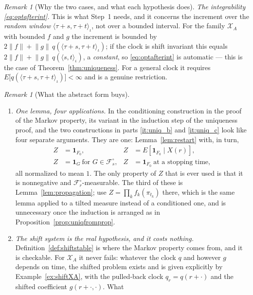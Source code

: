 \documentclass[11pt,a4paper]{article}
\theoremstyle{plain}
\theoremstyle{definition}
\theoremstyle{remark}
\newtheorem{remark}[theorem]{Remark}
\newcommand{\Filt}{\mathcal{F}}
\newcommand{\XX}{\mathcal{X}}                  %
\newcommand{\one}{\mathbf{1}}
\newcommand{\EK}{\cite{EK86}}
\begin{document}
\begin{remark}[Why the two cases, and what each hypothesis does]
  \emph{The integrability \eqref{eq:optafterint}.}  This is what Step~1 needs, and
  it concerns the increment over the \emph{random window}
  $\langle \tau+s, \tau+t \rangle_\iota$, not over a bounded interval.  For the
  family $\XX_A$ with bounded $f$ and $g$ the increment is bounded by
  $2\lVert f\rVert + \lVert g\rVert\, q(\langle \tau+s,\tau+t\rangle_\iota)$; if
  the clock is shift invariant this equals
  $2\lVert f\rVert + \lVert g\rVert\, q(\langle s,t\rangle_\iota)$, a
  \emph{constant}, so \eqref{eq:optafterint} is automatic --- this is the case of
  Theorem~\ref{thm:uniqueness}.  For a general clock it requires
  $E\bigl[q(\langle \tau+s,\tau+t\rangle_\iota)\bigr] < \infty$ and is a genuine
  restriction.
\end{remark}

\begin{remark}[What the abstract form buys]
  \label{rem:absuniqgain}
  \begin{enumerate}[label=(\roman*)]
  \item \emph{One lemma, four applications.}  In \EK{} the conditioning
    construction in the proof of the Markov property, its variant in the
    induction step of the uniqueness proof, and the two constructions in parts
    \ref{it:uniq_b} and \ref{it:uniq_c} look like four separate arguments.  They
    are one: Lemma~\ref{lem:restart} with, in turn,
    \begin{align*}
      Z &= \one_{F_0} , &
      Z &= E[\one_{F_0}\mid X(r)] , \\
      Z &= \one_G \ \text{for } G \in \Filt^\circ_s , &
      Z &= \one_{F_0} \ \text{at a stopping time} ,
    \end{align*}
    all normalized to mean $1$.  The only property of $Z$ that is ever used is
    that it is nonnegative and $\Filt^\circ_r$-measurable.  The third of these is
    Lemma~\ref{lem:propagation}; \EK{} use $Z = \prod_k f_k(\pi_{t_k})$ there,
    which is the same lemma applied to a tilted measure instead of a conditioned
    one, and is unnecessary once the induction is arranged as in
    Proposition~\ref{prop:uniqfromprop}.
  \item \emph{The shift system is the real hypothesis, and it costs nothing.}
    Definition~\ref{def:shiftstable} is where the Markov property comes from, and
    it is checkable.  For $\XX_A$ it never fails: whatever the clock $q$ and
    however $g$ depends on time, the shifted problem exists and is given
    explicitly by Example~\ref{ex:shiftXA}, with the pulled-back clock
    $q_r = q(r + \cdot)$ and the shifted coefficient $g(r+\cdot,\cdot)$.  What

\end{enumerate}
\end{remark}
\end{document}

